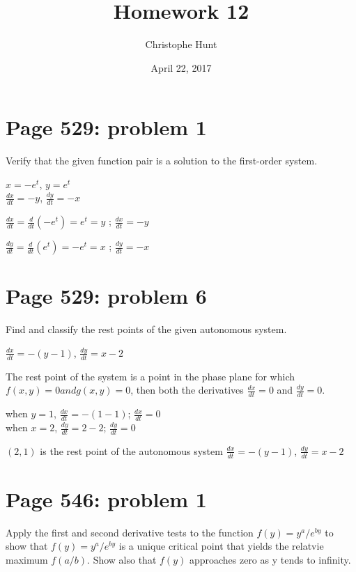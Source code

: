 \documentclass[]{article}
\title{Homework 12}
\author{Christophe Hunt}
\date{April 22, 2017}
\begin{document}
\maketitle

{
\setcounter{tocdepth}{2}
\tableofcontents
}
\newpage

\section{Page 529: problem 1}\label{page-529-problem-1}

Verify that the given function pair is a solution to the first-order
system.

\(x = -e^t\), \(y = e^t\)\\
\(\frac{dx}{dt} = -y\), \(\frac{dy}{dt} = -x\)

\(\frac{dx}{dt} = \frac{d}{dt}(-e^t) = e^t = y\) ;
\(\frac{dx}{dt} = -y\)

\(\frac{dy}{dt} = \frac{d}{dt}(e^t) = -e^t = x\) ;
\(\frac{dy}{dt} = -x\)

\section{Page 529: problem 6}\label{page-529-problem-6}

Find and classify the rest points of the given autonomous system.

\(\frac{dx}{dt} = -(y-1)\), \(\frac{dy}{dt} = x-2\)

The rest point of the system is a point in the phase plane for which
\(f(x,y) = 0 and g(x,y) = 0\), then both the derivatives
\(\frac{dx}{dt} = 0\) and \(\frac{dy}{dt}= 0\).

when \(y = 1\), \(\frac{dx}{dt} = -(1-1)\); \(\frac{dx}{dt}= 0\)\\
when \(x = 2\), \(\frac{dy}{dt} = 2 - 2\); \(\frac{dy}{dt} = 0\)

\((2,1)\) is the rest point of the autonomous system
\(\frac{dx}{dt} = -(y-1)\), \(\frac{dy}{dt} = x-2\)

\section{Page 546: problem 1}\label{page-546-problem-1}

Apply the first and second derivative tests to the function
\(f(y) = y^a/e^{by}\) to show that \(f(y) = y^a/e^{by}\) is a unique
critical point that yields the relatvie maximum \(f(a/b)\). Show also
that \(f(y)\) approaches zero as y tends to infinity.
\end{document}
